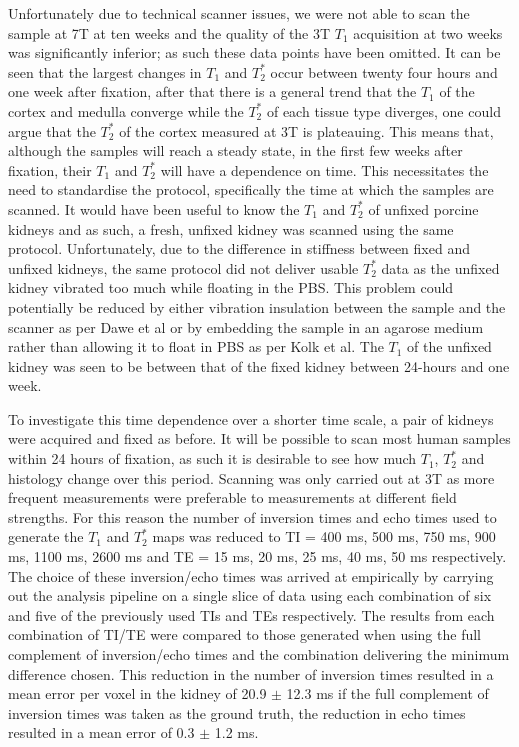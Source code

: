 Unfortunately due to technical scanner issues, we were not able to scan the sample at 7T at ten weeks and the quality of the 3T $T_1$ acquisition at two weeks was significantly inferior; as such these data points have been omitted. It can be seen that the largest changes in $T_1$ and $T_2^*$ occur between twenty four hours and one week after fixation, after that there is a general trend that the $T_1$ of the cortex and medulla converge while the $T_2^*$ of each tissue type diverges, one could argue that the $T_2^*$ of the cortex measured at 3T is plateauing. This means that, although the samples will reach a steady state, in the first few weeks after fixation, their $T_1$ and $T_2^*$ will have a dependence on time. This necessitates the need to standardise the protocol, specifically the time at which the samples are scanned. It would have been useful to know the $T_1$ and $T_2^*$ of unfixed porcine kidneys and as such, a fresh, unfixed kidney was scanned using the same protocol. Unfortunately, due to the difference in stiffness between fixed and unfixed kidneys, the same protocol did not deliver usable $T_2^*$ data as the unfixed kidney vibrated too much while floating in the \ac{PBS}. This problem could potentially be reduced by either vibration insulation between the sample and the scanner as per Dawe et al \cite{dawe_postmortem_nodate} or by embedding the sample in an agarose medium rather than allowing it to float in \ac{PBS} as per Kolk et al\cite{kolk_imaging_2014}. The $T_1$ of the unfixed kidney was seen to be between that of the fixed kidney between 24-hours and one week.

To investigate this time dependence over a shorter time scale, a pair of kidneys were acquired and fixed as before. It will be possible to scan most human samples within 24 hours of fixation, as such it is desirable to see how much $T_1$, $T_2^*$ and histology change over this period. Scanning was only carried out at 3T as more frequent measurements were preferable to measurements at different field strengths. For this reason the number of inversion times and echo times used to generate the $T_1$ and $T_2^*$ maps was reduced to \ac{TI} = 400 ms, 500 ms, 750 ms, 900 ms, 1100 ms, 2600 ms and \ac{TE} = 15 ms, 20 ms, 25 ms, 40 ms, 50 ms respectively. The choice of these inversion/echo times was arrived at empirically by carrying out the analysis pipeline on a single slice of data using each combination of six and five of the previously used \ac{TI}s and \ac{TE}s respectively. The results from each combination of \ac{TI}/\ac{TE} were compared to those generated when using the full complement of inversion/echo times and the combination delivering the minimum difference chosen. This reduction in the number of inversion times resulted in a mean error per voxel in the kidney of 20.9 $\pm$ 12.3 ms if the full complement of inversion times was taken as the ground truth, the reduction in echo times resulted in a mean error of 0.3 $\pm$ 1.2 ms.

